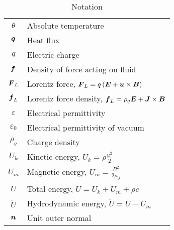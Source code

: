 \begin{table}
\begin{tabular}{ |c|l| }
        $\theta$ & Absolute temperature\\
        $\mbox{\boldmath $q$}$ & Heat flux\\
        $q$ & Electric charge\\
        $\mbox{\boldmath $f$}$ & Density of force acting on fluid\\
        $\mbox{\boldmath $F$}_L$ & Lorentz force, $\mbox{\boldmath $F$}_L = q\left(\mbox{\boldmath $E$} + \mbox{\boldmath $u$}\times\mbox{\boldmath $B$}\right)$\\
        $\mbox{\boldmath $f$}_L$ & Lorentz force density, $\mbox{\boldmath $f$}_L = \rho_q\mbox{\boldmath $E$} + \mbox{\boldmath $J$}\times\mbox{\boldmath $B$}$\\
        $\varepsilon$ & Electrical permittivity\\
        $\varepsilon_0$ & Electrical permittivity of vacuum\\
        $\rho_q$ & Charge density\\
        $U_k$ & Kinetic energy, $U_k = \rho\frac{u^2}{2}$ \\ 
        $U_m$ & Magnetic energy, $U_m = \frac{B^2}{2{}\mu_0}$ \\ 
        $U$ & Total energy, $U = U_k + U_m + \rho e$ \\ 
        $\tilde{U}$ & Hydrodynamic energy, $\tilde{U} = U - U_m$ \\ 
        $\mbox{\boldmath $n$}$ & Unit outer normal \\ 
        \hline
    \end{tabular}
    \caption{Notation}
    \label{table:notation}
\end{table}


